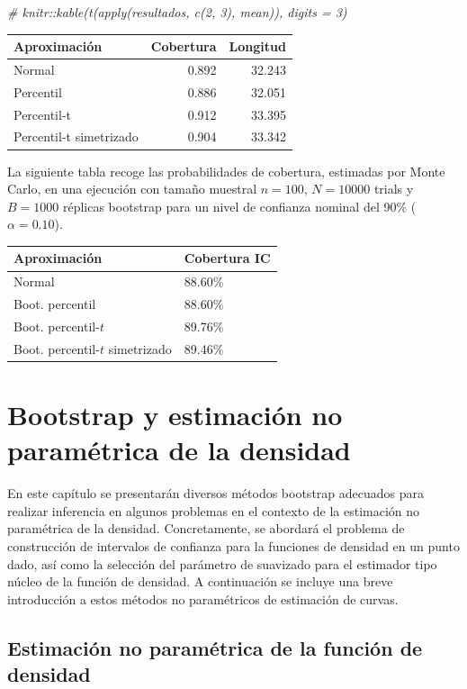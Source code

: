 \documentclass[]{book}
\newenvironment{Shaded}{\begin{snugshade}}{\end{snugshade}}
\newcommand{\CommentTok}[1]{\textcolor[rgb]{0.56,0.35,0.01}{\textit{#1}}}
\theoremstyle{definition}
\theoremstyle{definition}
\theoremstyle{definition}
\theoremstyle{remark}
\begin{document}
\begin{Shaded}
\begin{Highlighting}[]
\CommentTok{# knitr::kable(t(apply(resultados, c(2, 3), mean)), digits = 3)}
\end{Highlighting}
\end{Shaded}

\begin{longtable}[]{@{}lrr@{}}
\toprule
Aproximación & Cobertura & Longitud\tabularnewline
\midrule
\endhead
Normal & 0.892 & 32.243\tabularnewline
Percentil & 0.886 & 32.051\tabularnewline
Percentil-t & 0.912 & 33.395\tabularnewline
Percentil-t simetrizado & 0.904 & 33.342\tabularnewline
\bottomrule
\end{longtable}

La siguiente tabla recoge las probabilidades de cobertura, estimadas por
Monte Carlo, en una ejecución con tamaño muestral \(n=100\), \(N=10000\)
trials y \(B=1000\) réplicas bootstrap para un nivel de confianza
nominal del 90\% (\(\alpha =0.10\)).

\begin{longtable}[]{@{}ll@{}}
\toprule
Aproximación & Cobertura IC\tabularnewline
\midrule
\endhead
Normal & 88.60\%\tabularnewline
Boot. percentil & 88.60\%\tabularnewline
Boot. percentil-\(t\) & 89.76\%\tabularnewline
Boot. percentil-\(t\) simetrizado & 89.46\%\tabularnewline
\bottomrule
\end{longtable}

\chapter{Bootstrap y estimación no paramétrica de la
densidad}\label{cap6}

En este capítulo se presentarán diversos métodos bootstrap adecuados
para realizar inferencia en algunos problemas en el contexto de la
estimación no paramétrica de la densidad. Concretamente, se abordará el
problema de construcción de intervalos de confianza para la funciones de
densidad en un punto dado, así como la selección del parámetro de
suavizado para el estimador tipo núcleo de la función de densidad. A
continuación se incluye una breve introducción a estos métodos no
paramétricos de estimación de curvas.

\section{Estimación no paramétrica de la función de
densidad}\label{estimacion-no-parametrica-de-la-funcion-de-densidad}
\end{document}
